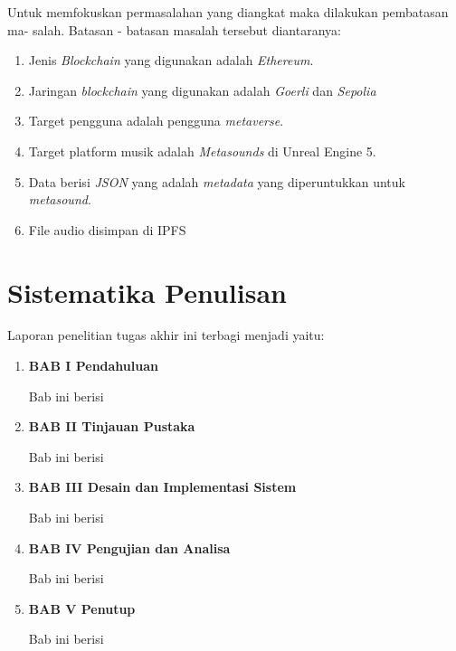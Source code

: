 Untuk memfokuskan permasalahan yang diangkat maka dilakukan pembatasan ma-
salah. Batasan - batasan masalah tersebut diantaranya:
\begin{enumerate}
  \item Jenis \emph{Blockchain} yang digunakan adalah \emph{Ethereum}.
  \item Jaringan \emph{blockchain} yang digunakan adalah \emph{Goerli} dan \emph{Sepolia}
  \item Target pengguna adalah pengguna \emph{metaverse}.
  \item Target platform musik adalah \emph{Metasounds} di Unreal Engine 5.
  \item Data berisi \emph{JSON} yang adalah \emph{metadata} yang diperuntukkan untuk \emph{metasound}.
  \item File audio disimpan di IPFS
\end{enumerate}

\section{Sistematika Penulisan}
\label{sec:sistematikapenulisan}

Laporan penelitian tugas akhir ini terbagi menjadi \lipsum[1][1-3] yaitu:

\begin{enumerate}[nolistsep]

  \item \textbf{BAB I Pendahuluan}

        Bab ini berisi \lipsum[2][1-5]

        \vspace{2ex}

  \item \textbf{BAB II Tinjauan Pustaka}

        Bab ini berisi \lipsum[3][1-5]

        \vspace{2ex}

  \item \textbf{BAB III Desain dan Implementasi Sistem}

        Bab ini berisi \lipsum[4][1-5]

        \vspace{2ex}

  \item \textbf{BAB IV Pengujian dan Analisa}

        Bab ini berisi \lipsum[5][1-5]

        \vspace{2ex}

  \item \textbf{BAB V Penutup}

        Bab ini berisi \lipsum[6][1-5]

\end{enumerate}

